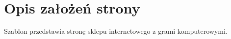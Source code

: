 \documentclass[12pt, letterpaper]{article}
\begin{document}
\section{Opis założeń strony}
\quad Szablon przedstawia stronę sklepu internetowego z grami komputerowymi. 
\newpage
\end{document}
